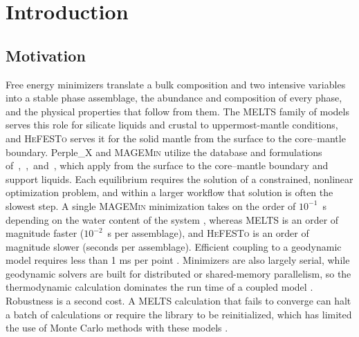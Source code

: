
\section{Introduction}\label{ch4-introduction}

\subsection{Motivation}\label{ch4-motivation}
Free energy minimizers translate a bulk composition and two intensive variables into a stable phase assemblage, the
abundance and composition of every phase, and the physical properties that follow from them. The \textsc{MELTS} family of models
\citep{ghiorsosack1995,ghiorso2002,gualda2012,ghiorsogualda2015} serves this role for silicate liquids and crustal to
uppermost-mantle conditions, and \textsc{HeFESTo} \citep{stixrude2005,stixrude2011,stixrude2024} serves it for the solid mantle
from the surface to the core--mantle boundary. Perple\_X \citep{connolly2005} and \textsc{MAGEMin} \citep{riel2022} utilize the 
database and formulations of~\citet{holland2011},~\citet{holland2018},~and~\citet{holland1998}, which apply from the surface to the 
core--mantle boundary and support liquids. 
Each equilibrium requires the solution of a constrained, nonlinear optimization problem, and
within a larger workflow that solution is often the slowest step. A single \textsc{MAGEMin} minimization takes on the order of
$10^{-1}$~s depending on the water content of the system \citep{riel2022,candioti2026}, whereas \textsc{MELTS} is an order of magnitude faster ($10^{-2}$~s per assemblage), 
and \textsc{HeFESTo} is an order of magnitude slower (seconds per assemblage). Efficient coupling to a geodynamic
model requires less than 1 ms per point \citep{kerswell2024,candioti2026}.
Minimizers are also largely serial, while geodynamic solvers are built for distributed or shared-memory parallelism, so the
thermodynamic calculation dominates the run time of a coupled model \citep{yuan2026,candioti2026}. Robustness is a second cost. A
\textsc{MELTS} calculation that fails to converge can halt a batch of calculations or require the library to be reinitialized,
which has limited the use of Monte Carlo methods with these models \citep{gleeson2025}.

